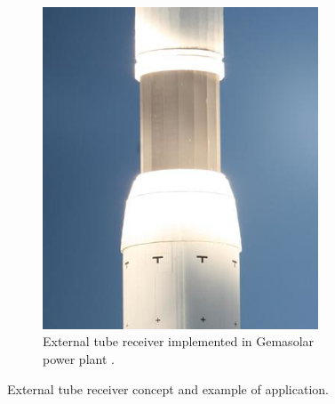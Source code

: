 \begin{figure}[!htbp]
\begin{subfigure}[b]{0.5\textwidth}
                \includegraphics[width=0.9\textwidth]{FIG/Gemasolar_tower_heatshield}
                \caption{External tube receiver implemented in Gemasolar power plant \cite{Microtherm2012}.}\label{Gemasolar_tower_heatshield}
        \end{subfigure}
        \caption[External tube receiver concept and example of application.]{External tube receiver concept and example of application.}\label{TubeReceiverConceptGemasolar}
\end{figure}


